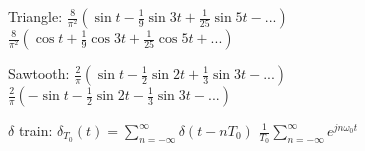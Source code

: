 \documentclass[6pt]{article}
\theoremstyle{definition}
\theoremstyle{definition}
\begin{document}
\begin{multicols*}{3}
    Triangle: 
        $\frac{8}{\pi^2}(\sin t - \frac{1}{9} \sin 3t + \frac{1}{25} \sin 5t - ...)$\\
        $\frac{8}{\pi^2}(\cos t + \frac 1 9 \cos 3t + \frac 1 {25} \cos 5t + ...)$

    Sawtooth:   
        $\frac 2{\pi} (\sin t - \frac{1}{2} \sin 2t + \frac{1}{3} \sin 3t - ...)$
        $\frac 2{\pi} (-\sin t - \frac{1}{2} \sin 2t - \frac{1}{3} \sin 3t - ...)$

    $\delta$ train:     
        $\delta_{T_0} (t) = \sum_{n=-\infty}^{\infty} \delta(t - nT_0)$ 
        $\frac{1}{T_0} \sum_{n=-\infty}^{\infty} e^{jn\omega_0 t}$
\end{multicols*}
\end{document}
